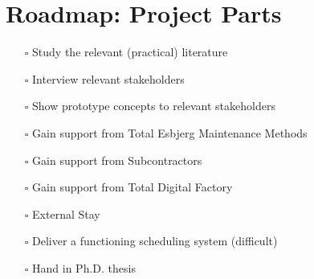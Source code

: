 \begin{minipage}[t]{0.46\textwidth}
\section*{Roadmap: Project Parts}
\begin{itemize}
	\item[\rlap{\raisebox{0.3ex}{\hspace{0.4ex}\tiny \ding{52}}}$\square$] Study the relevant (practical) literature
	\item[\rlap{\raisebox{0.3ex}{\hspace{0.4ex}\tiny \ding{52}}}$\square$] Interview relevant stakeholders
	\item[\rlap{\raisebox{0.3ex}{\hspace{0.4ex}\tiny \ding{52}}}$\square$] Show prototype concepts to relevant stakeholders
	\item[\rlap{\raisebox{0.3ex}{\hspace{0.4ex}\tiny \ding{52}}}$\square$] Gain support from Total Esbjerg Maintenance Methods
	\item[\rlap{\raisebox{0.3ex}{\hspace{0.4ex}\tiny \ding{52}}}$\square$] Gain support from Subcontractors
	\item[\rlap{\raisebox{0.3ex}{\hspace{0.4ex}\tiny \ding{52}}}$\square$] Gain support from Total Digital Factory
	\item[$\square$] External Stay
	\item[$\square$] Deliver a functioning scheduling system (difficult)
	\item[$\square$] Hand in Ph.D. thesis
\end{itemize}

\end{minipage}
